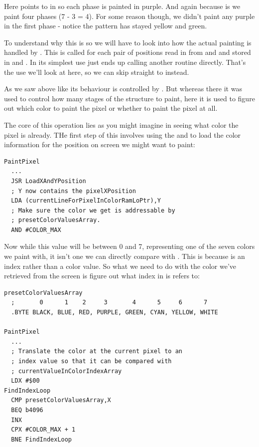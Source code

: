 Here  points to  in  so each phase is painted in purple. And again
because  is  we paint four phases (7 - 3 = 4). For some reason though, we
didn't paint any purple in the first phase - notice the pattern has stayed yellow and green.  


To understand why this is so we will have to look into how the actual painting is handled by . This is called for each pair of positions read
in from  and  and stored in  and .
In its simplest use  just ends up calling another routine  directly.
That's the use we'll look at here, so we can skip straight to  instead.

As we saw above like 
its behaviour is controlled by . But whereas there it was used to control how many
stages of the structure to paint, here it is used to figure out which color to paint the pixel or whether to paint the pixel 
at all.

The core of this operation lies as you might imagine in seeing what color the pixel is already. THe first step of this involves
using the  and  to load the color information for the position on screen we might 
want to paint: 

\begin{lstlisting}
PaintPixel   
  ...
  JSR LoadXAndYPosition
  ; Y now contains the pixelXPosition
  LDA (currentLineForPixelInColorRamLoPtr),Y
  ; Make sure the color we get is addressable by
  ; presetColorValuesArray.
  AND #COLOR_MAX
\end{lstlisting}

Now while this value will be between 0 and 7, representing one of the seven colors we paint with, it isn't one we can directly
compare with . This is because  is an index rather
than a color value. So what we need to do with the color we've retrieved from the screen is figure out what index in 
 is refers to:

\begin{lstlisting}
presetColorValuesArray
  ;       0      1    2     3       4      5     6      7
  .BYTE BLACK, BLUE, RED, PURPLE, GREEN, CYAN, YELLOW, WHITE

PaintPixel   
  ...
  ; Translate the color at the current pixel to an
  ; index value so that it can be compared with
  ; currentValueInColorIndexArray
  LDX #$00
FindIndexLoop
  CMP presetColorValuesArray,X
  BEQ b4096
  INX 
  CPX #COLOR_MAX + 1
  BNE FindIndexLoop
\end{lstlisting}

